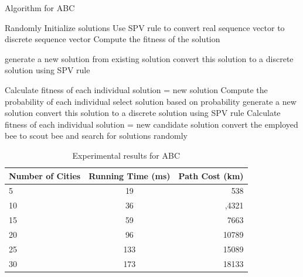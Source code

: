 \documentclass[conference]{IEEEtran}
\begin{document}
\begin{algorithm}[H]
\caption{Algorithm for ABC}
\begin{algorithmic}[1]
\STATE Randomly Initialize solutions
\STATE Use SPV rule to convert real sequence vector to discrete sequence vector
\ENDFOR 
\STATE Compute the fitness of the solution
\ENDFOR 

\REPEAT
{}

\STATE generate a new solution from existing solution
\STATE convert this solution to a discrete solution using SPV rule
\ENDFOR 


\STATE Calculate fitness of each individual
\STATE solution = new solution
\ENDIF
\ENDFOR
\STATE Compute the probability of each individual
\STATE select solution based on probability
\STATE generate a new solution
\STATE convert this solution to a discrete solution using SPV rule
\ENDFOR
\STATE Calculate fitness of each individual
\STATE solution = new candidate solution
\ENDIF
\ENDFOR
{}
\STATE convert the employed bee to scout bee and search for solutions randomly
\ENDIF

\end{algorithmic}
\end{algorithm}



\begin{table}[h!]
 \label{tab:table1}\caption{Experimental results for ABC}
  \begin{center}
    \begin{tabular}{l|c|r}
      \textbf{Number of Cities} & \textbf{Running Time (ms)} & \textbf{Path Cost (km)}\\
      \hline
      5 & 19 & 538\\
      10 & 36& ,4321\\
      15 & 59  & 7663\\
      20 & 96  & 10789\\ 
      25 & 133 & 15089\\
      30 & 173  & 18133\\
    \end{tabular}
  \end{center}
\end{table}
\end{document}
